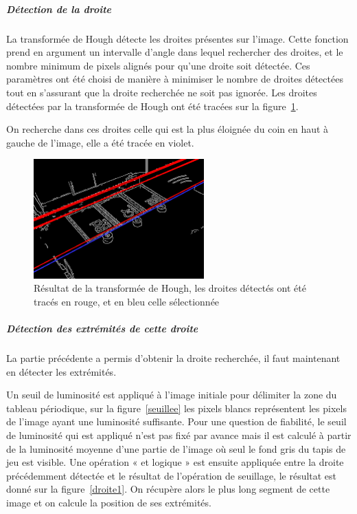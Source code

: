 \documentclass{article}
\begin{document}
\subparagraph{Détection de la droite}
La transformée de Hough détecte les droites présentes sur l’image. Cette fonction prend en argument un intervalle d’angle dans lequel rechercher des droites,
et le nombre minimum de pixels alignés pour qu’une droite soit détectée. Ces paramètres ont été choisi de manière à minimiser le nombre de droites détectées tout
en s’assurant que la droite recherchée ne soit pas ignorée. Les droites détectées par la transformée de Hough ont été tracées sur la figure~\ref{hough1}.

On recherche dans ces droites celle qui est la plus éloignée du coin en haut à gauche de l’image, elle a été tracée en violet.
\begin{figure}[!h]
\begin{center}
\includegraphics[height=130pt]{image_Canny_hough1.png}  
\end{center}
\caption{Résultat de la transformée de Hough, les droites détectés ont été tracés en rouge, et en bleu celle sélectionnée}
\label{hough1}
\end{figure}

\subparagraph{Détection des extrémités de cette droite}
La partie précédente a permis d’obtenir la droite recherchée, il faut maintenant en détecter les extrémités.

Un seuil de luminosité est appliqué à l’image initiale pour délimiter la zone du tableau périodique, sur la figure~\ref{seuillee} les pixels blancs
représentent les pixels de l’image ayant une luminosité suffisante. Pour une question de fiabilité, le seuil de luminosité qui est
appliqué n’est pas fixé par avance mais il est calculé à partir de la luminosité moyenne d’une partie de l’image où seul le fond gris
du tapis de jeu est visible.
Une opération « et logique » est ensuite appliquée entre la droite précédemment détectée et le résultat de l’opération de seuillage,
le résultat est donné sur la figure~\ref{droite1}. On récupère alors le plus long segment de cette image et on calcule la position de ses extrémités.
\end{document}
